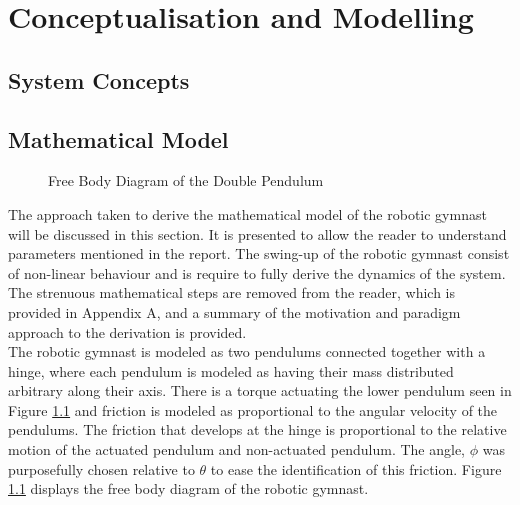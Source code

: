 \chapter{Conceptualisation and Modelling}
\label{chp:concept_model}


\section{System Concepts}
\section{Mathematical Model}
\begin{figure}[h]
	\centering
	
	\caption{Free Body Diagram of the Double Pendulum}
	\label{fig:doublePen}
\end{figure}

The approach taken to derive the mathematical model of the robotic gymnast will be discussed in this section. It is presented to allow the reader to understand parameters mentioned in the report. The swing-up of the robotic gymnast consist of non-linear behaviour and is require to fully derive the dynamics of the system. The strenuous mathematical steps are removed from the reader, which is provided in Appendix A, and a summary of the motivation and paradigm approach to the derivation is provided.\\

The robotic gymnast is modeled as two pendulums connected together with a hinge, where each pendulum is modeled as having their mass distributed arbitrary along their axis. There is a torque actuating the lower pendulum seen in Figure \ref{fig:doublePen} and friction is modeled as proportional to the angular velocity of the pendulums. The friction that develops at the hinge is proportional to the relative motion of the actuated pendulum and non-actuated pendulum. The angle, $\phi$ was purposefully chosen relative to $\theta$ to ease the identification of this friction. Figure \ref{fig:doublePen} displays the free body diagram of the robotic gymnast.\\

